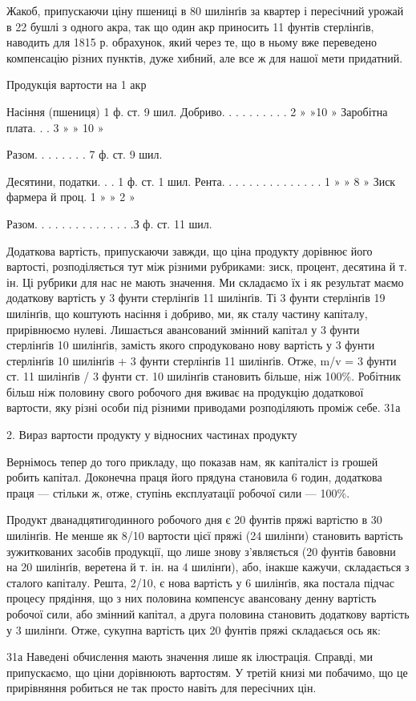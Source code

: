 Жакоб, припускаючи ціну пшениці в 80 шилінґів за квартер і пересічний урожай в 22 бушлі з одного
акра, так що один акр приносить 11 фунтів стерлінґів, наводить для 1815 р. обрахунок, який через те,
що в ньому вже переведено компенсацію різних
пунктів, дуже хибний, але все ж для нашої мети придатний.

Продукція вартости на 1 акр

Насіння (пшениця) 1 ф. ст. 9 шил.
Добриво. . . . . . . . . . 2  » »10 »
Заробітна плата. . . 3 » »  10 »

Разом. . . . . . .  . 7 ф. ст. 9 шил.

Десятини, податки. . . 1 ф. ст. 1 шил.
Рента. . . . . . . . . . . . . . . 1 » » 8 »
Зиск фармера й проц. 1 » » 2 »

Разом. . . . . . . . . . . . . . .З ф. ст. 11 шил.

Додаткова вартість, припускаючи завжди, що ціна продукту дорівнює його вартості, розподіляється тут
між різними рубриками: зиск, процент, десятина й т. ін. Ці рубрики для нас не мають значення. Ми
складаємо їх і як результат маємо додаткову вартість у 3 фунти стерлінґів 11 шилінґів. Ті 3 фунти
стерлінґів 19 шилінґів, що коштують насіння і добриво, ми, як сталу частину капіталу, прирівнюємо
нулеві. Лишається авансований змінний капітал у 3 фунти стерлінґів 10 шилінґів, замість якого
спродуковано нову вартість у 3 фунти стерлінґів 10 шилінґів + 3 фунти стерлінґів 11 шилінґів. Отже,
m/v = 3 фунти ст. 11 шилінґів / 3 фунти ст. 10 шилінґів становить більше, ніж 100\%. Робітник більш
ніж половину свого робочого дня вживає на продукцію додаткової вартости, яку різні особи під різними
приводами  розподіляють проміж себе. 31а

2. Вираз вартости продукту у відносних частинах продукту

Вернімось тепер до того прикладу, що показав нам, як капіталіст із грошей робить капітал. Доконечна
праця його прядуна
становила 6 годин, додаткова праця — стільки ж, отже, ступінь експлуатації робочої сили — 100\%.

Продукт дванадцятигодинного робочого дня є 20 фунтів пряжі вартістю в 30 шилінґів. Не менше як 8/10
вартости цієї пряжі (24 шилінґи) становить вартість зужиткованих засобів продукції, що лише знову
з’являється (20 фунтів бавовни на 20 шилінґів, веретена й т. ін. на 4 шилінґи), або, інакше кажучи,
складається з сталого капіталу. Решта, 2/10, є нова вартість у 6 шилінґів, яка постала підчас
процесу прядіння, що з них половина компенсує авансовану денну вартість робочої сили, або змінний
капітал, а друга половина становить додаткову вартість у 3 шилінґи. Отже, сукупна вартість цих 20
фунтів пряжі складаєься ось як:

31а Наведені обчислення мають значення лише як ілюстрація. Справді, ми припускаємо, що ціни
дорівнюють вартостям. У третій книзі ми побачимо,
що це прирівняння робиться не так просто навіть для пересічних цін.
